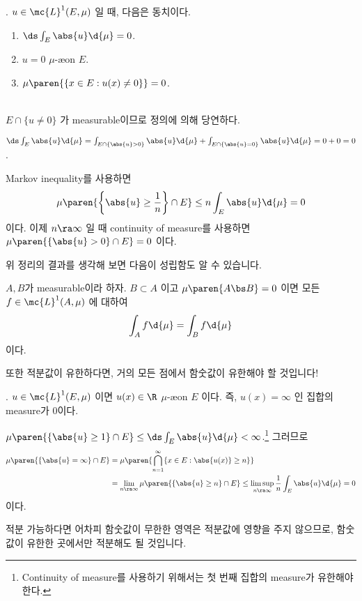 \thm. \(u\in \mc{L}^{1}(E, \mu)\) 일 때, 다음은 동치이다.
\begin{enumerate}
    \item \(\ds \int_E \abs{u} \d{\mu} = 0\).
    \item \(u = 0\) \(\mu\)-\ae on \(E\).
    \item \(\mu\paren{\{x \in E : u(x) \neq 0\}} = 0\).
\end{enumerate}

\pf \\
 \(E\cap\{u\neq 0\}\) 가 measurable이므로 정의에 의해 당연하다.

 \(\ds \int_E \abs{u} \d{\mu} = \int_{E \cap \{\abs{u} > 0\}} \abs{u} \d{\mu} + \int_{E \cap \{\abs{u} = 0\}} \abs{u} \d{\mu} = 0 + 0 = 0\).

 Markov inequality를 사용하면
\[
    \mu\paren{\left\{\abs{u} \geq \frac{1}{n}\right\} \cap E} \leq n\int_E \abs{u} \d{\mu} = 0
\]
이다. 이제 \(n\ra \infty\) 일 때 continuity of measure를 사용하면 \(\mu\paren{\{\abs{u} > 0\} \cap E} = 0\) 이다.

위 정리의 결과를 생각해 보면 다음이 성립함도 알 수 있습니다.

\rmk \(A, B\)가 measurable이라 하자. \(B \subset A\) 이고 \(\mu\paren{A \bs B} = 0\) 이면 모든 \(f \in \mc{L}^{1}(A, \mu)\) 에 대하여
\[
    \int_A f \d{\mu} = \int_B f \d{\mu}
\]
이다.

또한 적분값이 유한하다면, 거의 모든 점에서 함숫값이 유한해야 할 것입니다!

\thm. \(u \in \mc{L}^{1}(E, \mu)\) 이면 \(u(x) \in \R\) \(\mu\)-\ae on \(E\) 이다. 즉, \(u(x) = \infty\) 인 집합의 measure가 0이다.

\pf \(\mu\paren{\{\abs{u} \geq 1\}\cap E} \leq \ds \int_E \abs{u} \d{\mu} < \infty\).\footnote{Continuity of measure를 사용하기 위해서는 첫 번째 집합의 measure가 유한해야 한다.} 그러므로
\[
    \begin{aligned}
        \mu\paren{\{\abs{u} = \infty\} \cap E} & = \mu\paren{\bigcap_{n=1}^\infty \{x \in E : \abs{u(x)} \geq n\}}                                                           \\
                                               & = \lim_{n \ra \infty} \mu\paren{\{\abs{u} \geq n\} \cap E} \leq \limsup_{n\ra\infty} \frac{1}{n} \int_E \abs{u} \d{\mu} = 0
    \end{aligned}
\]
이다.

적분 가능하다면 어차피 함숫값이 무한한 영역은 적분값에 영향을 주지 않으므로, 함숫값이 유한한 곳에서만 적분해도 될 것입니다.

